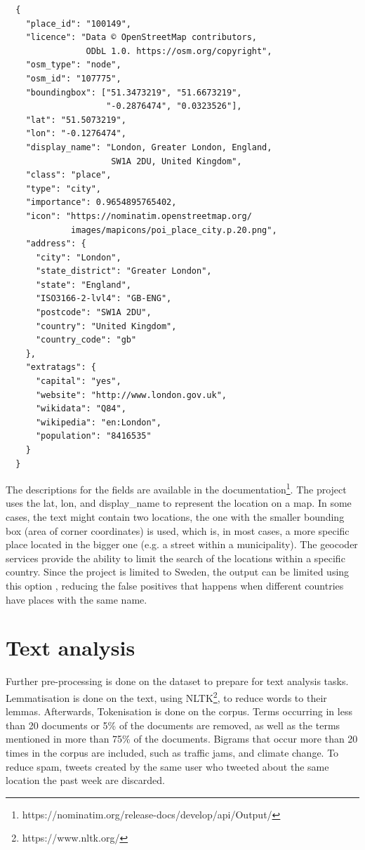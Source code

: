   \begin{verbatim}
  {
    "place_id": "100149",
    "licence": "Data © OpenStreetMap contributors, 
                ODbL 1.0. https://osm.org/copyright",
    "osm_type": "node",
    "osm_id": "107775",
    "boundingbox": ["51.3473219", "51.6673219", 
                    "-0.2876474", "0.0323526"],
    "lat": "51.5073219",
    "lon": "-0.1276474",
    "display_name": "London, Greater London, England, 
                     SW1A 2DU, United Kingdom",
    "class": "place",
    "type": "city",
    "importance": 0.9654895765402,
    "icon": "https://nominatim.openstreetmap.org/
             images/mapicons/poi_place_city.p.20.png",
    "address": {
      "city": "London",
      "state_district": "Greater London",
      "state": "England",
      "ISO3166-2-lvl4": "GB-ENG",
      "postcode": "SW1A 2DU",
      "country": "United Kingdom",
      "country_code": "gb"
    },
    "extratags": {
      "capital": "yes",
      "website": "http://www.london.gov.uk",
      "wikidata": "Q84",
      "wikipedia": "en:London",
      "population": "8416535"
    }
  }                           
  \end{verbatim}

The descriptions for the fields are available in the
documentation\footnote{https://nominatim.org/release-docs/develop/api/Output/}. The project uses
the lat, lon, and display\_name to represent the location on a map. In some cases, the text might
contain two locations, the one with the smaller bounding box (area of corner coordinates) is used,
which is, in most cases, a more specific place located in the bigger one (e.g. a street within a
municipality). The geocoder services provide the ability to limit the search of the locations
within a specific country. Since the project is limited to Sweden, the output can be limited using
this option , reducing the false positives that happens when different countries have places with
the same name.

\section{Text analysis}
  
Further pre-processing is done on the dataset to prepare for text analysis tasks. Lemmatisation is
done on the text, using \ac{NLTK}\footnote{https://www.nltk.org/}, to reduce words to their lemmas.
Afterwards, Tokenisation is done on the corpus. Terms occurring in less than 20 documents or 5\% of
the documents are removed, as well as the terms mentioned in more than 75\% of the documents.
Bigrams that occur more than 20 times in the corpus are included, such as traffic jams, and climate
change. To reduce spam, tweets created by the same user who tweeted about the same location the past
week are discarded.

